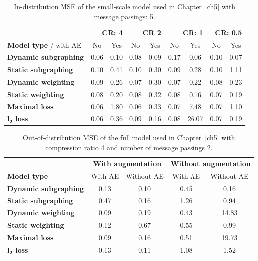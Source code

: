\begin{appendices}
\begin{table}[H]
\centering
\caption{In-distribution MSE of the small-scale model used in Chapter~\ref{ch5} with message passings: 5.}
\label{table_in_distribution_5}
\begin{tabular}{lcccccccc}
\toprule
 & \multicolumn{2}{r}{\textbf{CR: 4}} & \multicolumn{2}{r}{\textbf{CR 2}} & \multicolumn{2}{r}{\textbf{CR: 1}} & \multicolumn{2}{r}{\textbf{CR: 0.5}} \\
 \cmidrule{2-9}
\textbf{Model type} / with AE & No & Yes & No & Yes & No & Yes & No & Yes \\
\midrule
\textbf{Dynamic subgraphing} & 0.06 & 0.10 & 0.08 & 0.09 & 0.17 & 0.06 & 0.10 & 0.07 \\
\textbf{Static subgraphing} & 0.10 & 0.41 & 0.10 & 0.30 & 0.09 & 0.28 & 0.10 & 1.11 \\
\textbf{Dynamic weighting} & 0.09 & 0.26 & 0.07 & 0.30 & 0.07 & 0.22 & 0.08 & 0.23 \\
\textbf{Static weighting} & 0.08 & 0.20 & 0.08 & 0.32 & 0.08 & 0.16 & 0.07 & 0.19 \\
\textbf{Maximal loss} & 0.06 & 1.80 & 0.06 & 0.33 & 0.07 & 7.48 & 0.07 & 1.10 \\
\textbf{$\boldsymbol{l_2}$ loss} & 0.06 & 0.36 & 0.09 & 0.16 & 0.08 & 26.07 & 0.07 & 0.19 \\
\bottomrule
\end{tabular}
\end{table}

\begin{table}
\centering
\caption{Out-of-distribution MSE of the full model used in Chapter~\ref{ch5} with compression ratio 4 and number of message passings 2.}
\label{table_4_2}
\begin{tabular}{lcccc}
\toprule
 & \multicolumn{2}{c}{\textbf{With augmentation}} & \multicolumn{2}{c}{\textbf{Without augmentation}} \\
 \cmidrule{2-3} \cmidrule{4-5}
\textbf{Model type} & With AE & Without AE & With AE & Without AE \\
\midrule
\textbf{Dynamic subgraphing} & 0.13 & 0.10 & 0.45 & 0.16 \\
\textbf{Static subgraphing} & 0.47 & 0.16 & 1.26 & 0.94 \\
\textbf{Dynamic weighting} & 0.09 & 0.19 & 0.43 & 14.83 \\
\textbf{Static weighting} & 0.12 & 0.67 & 0.55 & 0.99 \\
\textbf{Maximal loss} & 0.09 & 0.16 & 0.51 & 19.73 \\
\textbf{$\boldsymbol{l_2}$ loss} & 0.13 & 0.11 & 1.08 & 1.52 \\
\bottomrule
\end{tabular}
\end{table}


\end{appendices}
